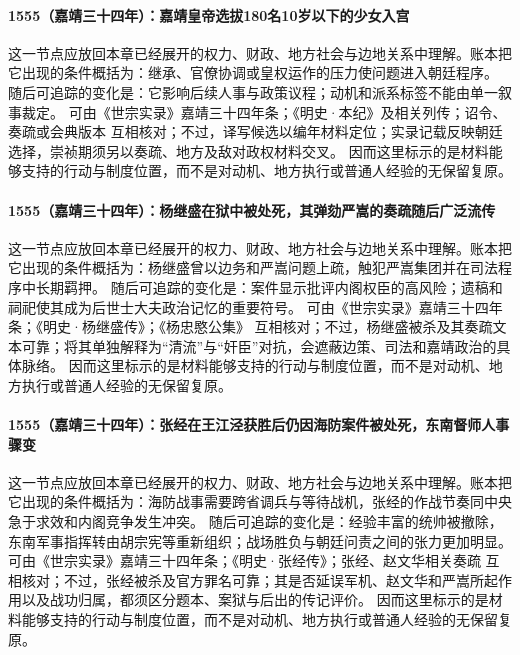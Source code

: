 \paragraph{1555（嘉靖三十四年）：嘉靖皇帝选拔180名10岁以下的少女入宫} 这一节点应放回本章已经展开的权力、财政、地方社会与边地关系中理解。账本把它出现的条件概括为：继承、官僚协调或皇权运作的压力使问题进入朝廷程序。 随后可追踪的变化是：它影响后续人事与政策议程；动机和派系标签不能由单一叙事裁定。 可由《世宗实录》嘉靖三十四年条；《明史·本纪》及相关列传；诏令、奏疏或会典版本 互相核对；不过，译写候选以编年材料定位；实录记载反映朝廷选择，崇祯期须另以奏疏、地方及敌对政权材料交叉。 因而这里标示的是材料能够支持的行动与制度位置，而不是对动机、地方执行或普通人经验的无保留复原。

\paragraph{1555（嘉靖三十四年）：杨继盛在狱中被处死，其弹劾严嵩的奏疏随后广泛流传} 这一节点应放回本章已经展开的权力、财政、地方社会与边地关系中理解。账本把它出现的条件概括为：杨继盛曾以边务和严嵩问题上疏，触犯严嵩集团并在司法程序中长期羁押。 随后可追踪的变化是：案件显示批评内阁权臣的高风险；遗稿和祠祀使其成为后世士大夫政治记忆的重要符号。 可由《世宗实录》嘉靖三十四年条；《明史·杨继盛传》；《杨忠愍公集》 互相核对；不过，杨继盛被杀及其奏疏文本可靠；将其单独解释为“清流”与“奸臣”对抗，会遮蔽边策、司法和嘉靖政治的具体脉络。 因而这里标示的是材料能够支持的行动与制度位置，而不是对动机、地方执行或普通人经验的无保留复原。

\paragraph{1555（嘉靖三十四年）：张经在王江泾获胜后仍因海防案件被处死，东南督师人事骤变} 这一节点应放回本章已经展开的权力、财政、地方社会与边地关系中理解。账本把它出现的条件概括为：海防战事需要跨省调兵与等待战机，张经的作战节奏同中央急于求效和内阁竞争发生冲突。 随后可追踪的变化是：经验丰富的统帅被撤除，东南军事指挥转由胡宗宪等重新组织；战场胜负与朝廷问责之间的张力更加明显。 可由《世宗实录》嘉靖三十四年条；《明史·张经传》；张经、赵文华相关奏疏 互相核对；不过，张经被杀及官方罪名可靠；其是否延误军机、赵文华和严嵩所起作用以及战功归属，都须区分题本、案狱与后出的传记评价。 因而这里标示的是材料能够支持的行动与制度位置，而不是对动机、地方执行或普通人经验的无保留复原。

